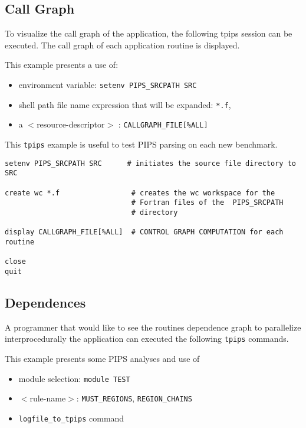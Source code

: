 \documentclass[a4paper]{article}
\begin{document}
\subsection{Call Graph}
\label{exm1}

To visualize the  call graph of the application, the following tpips
session can be executed. The call graph of each application routine is
displayed.

This example presents a use of:

\begin{itemize}
\item environment variable: \verb+setenv PIPS_SRCPATH SRC+
\item shell path file name expression that will be expanded: \verb+*.f+,
\item a $<$resource-descriptor$>$ : \verb+CALLGRAPH_FILE[%ALL]+
\end{itemize}
This \texttt{tpips} example is useful to test PIPS parsing on each new
benchmark.

\begin{verbatim}
setenv PIPS_SRCPATH SRC      # initiates the source file directory to SRC

create wc *.f                 # creates the wc workspace for the
                              # Fortran files of the  PIPS_SRCPATH 
                              # directory

display CALLGRAPH_FILE[%ALL]  # CONTROL GRAPH COMPUTATION for each routine

close 
quit

\end{verbatim}


\subsection{Dependences}
\label{exm2}

A programmer that would like to see the routines dependence graph to
parallelize interprocedurally the application can executed the following
\texttt{tpips} commands.

This example presents some PIPS analyses and use of
\begin{itemize}
\item module selection: \verb+module TEST+
\item $<$rule-name$>$: \verb+MUST_REGIONS+, \verb+REGION_CHAINS+
\item \verb+logfile_to_tpips+ command
\end{itemize}
\end{document}
